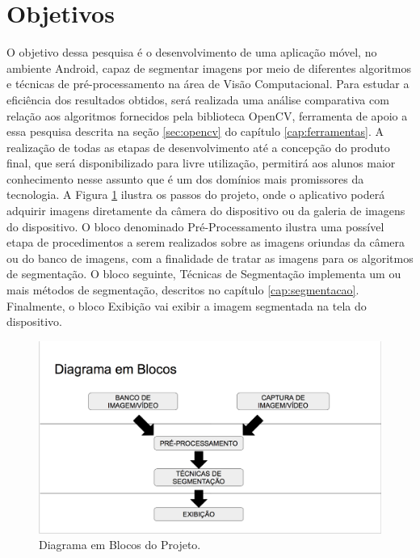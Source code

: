 \section{Objetivos}\label{sec:objetivos}
O objetivo dessa pesquisa é o desenvolvimento de uma aplicação móvel, no ambiente Android, capaz de segmentar imagens por meio de diferentes algoritmos e técnicas de pré-processamento na área de Visão Computacional. Para estudar a eficiência dos resultados obtidos, será realizada uma análise comparativa com relação aos algoritmos fornecidos pela biblioteca OpenCV, ferramenta de apoio a essa pesquisa descrita na seção \ref{sec:opencv} do capítulo \ref{cap:ferramentas}. A realização de todas as etapas de desenvolvimento até a concepção do produto final, que será disponibilizado para livre utilização, permitirá aos alunos maior conhecimento nesse assunto que é um dos domínios mais promissores da tecnologia. A Figura \ref{fig:diag_blocos} ilustra os passos do projeto, onde o aplicativo poderá adquirir imagens diretamente da câmera do dispositivo ou da galeria de imagens do dispositivo. O bloco denominado Pré-Processamento ilustra uma possível etapa de procedimentos a serem realizados sobre as imagens oriundas da câmera ou do banco de imagens, com a finalidade de tratar as imagens para os algoritmos de segmentação. O bloco seguinte, Técnicas de Segmentação implementa um ou mais métodos de segmentação, descritos no capítulo \ref{cap:segmentacao}. Finalmente, o bloco Exibição vai exibir a imagem segmentada na tela do dispositivo. 

  \begin{figure}[!htb]
       \begin{center}  
          \includegraphics[width=0.7\columnwidth]{img/diag_blocos.png}
           \caption{\label{fig:diag_blocos}Diagrama em Blocos do Projeto.}
       \end{center}
   \end{figure}



